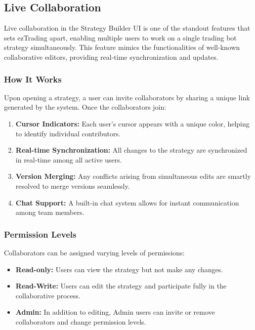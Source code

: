\subsection{Live Collaboration}
\label{sec:live-collaboration}

Live collaboration in the Strategy Builder UI is one of the standout features that sets ezTrading apart, enabling multiple users to work on a single trading bot strategy simultaneously. This feature mimics the functionalities of well-known collaborative editors, providing real-time synchronization and updates.

\subsubsection{How It Works}
\label{subsubsec:how-it-works}

Upon opening a strategy, a user can invite collaborators by sharing a unique link generated by the system. Once the collaborators join:

\begin{enumerate}
    \item \textbf{Cursor Indicators:} Each user's cursor appears with a unique color, helping to identify individual contributors.
    \item \textbf{Real-time Synchronization:} All changes to the strategy are synchronized in real-time among all active users.
    \item \textbf{Version Merging:} Any conflicts arising from simultaneous edits are smartly resolved to merge versions seamlessly.
    \item \textbf{Chat Support:} A built-in chat system allows for instant communication among team members.
\end{enumerate}

\subsubsection{Permission Levels}
\label{subsubsec:permission-levels}

Collaborators can be assigned varying levels of permissions:

\begin{itemize}
    \item \textbf{Read-only:} Users can view the strategy but not make any changes.
    \item \textbf{Read-Write:} Users can edit the strategy and participate fully in the collaborative process.
    \item \textbf{Admin:} In addition to editing, Admin users can invite or remove collaborators and change permission levels.
\end{itemize}

